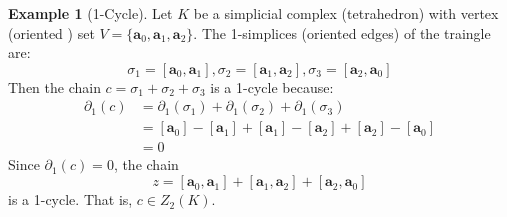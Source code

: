 \documentclass[12pt,oneside,reqno]{amsart}
\theoremstyle{plain}
\theoremstyle{definition}
\newtheorem{example}{Example}[section]
\theoremstyle{remark}
\newcommand{\btext}[1]{\mathbf{#1}}
\newcommand{\0}{{\textbf{0}}}
\begin{document}
\begin{example}[1-Cycle]\label{eq:1 Cycle}
Let $K$ be a simplicial complex (tetrahedron) with vertex (oriented ) set $V = \{\btext{a}_0, \btext{a}_1, \btext{a}_2\}$. The 1-simplices (oriented edges) of the traingle are:
\[
\sigma_1 = [\btext{a}_0, \btext{a}_1], \sigma_2 = [\btext{a}_1, \btext{a}_2], \sigma_3 = [\btext{a}_2, \btext{a}_0]
\]
Then the chain $c = \sigma_1 + \sigma_2 + \sigma_3$ is a 1-cycle because:
\begin{align*}
\partial_1(c) & = \partial_1(\sigma_1) + \partial_1(\sigma_2) + \partial_1(\sigma_3) \\
& = [\btext{a}_0] - [\btext{a}_1] + [\btext{a}_1] - [\btext{a}_2] + [\btext{a}_2] - [\btext{a}_0]  \\
& = 0
\end{align*}
Since $\partial_1(c) = 0$, the chain
\[
z = [\btext{a}_0, \btext{a}_1] + [\btext{a}_1, \btext{a}_2] + [\btext{a}_2, \btext{a}_0] 
\]
is a 1-cycle. That is, $c \in Z_2(K)$.
\end{example}
\end{document}
